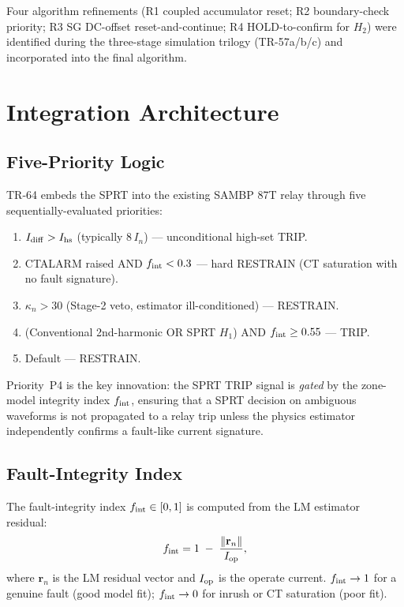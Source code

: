 Four algorithm refinements (R1 coupled accumulator reset; R2 boundary-check
priority; R3 SG DC-offset reset-and-continue; R4 HOLD-to-confirm for $H_2$)
were identified during the three-stage simulation trilogy (TR-57a/b/c) and
incorporated into the final algorithm.

\section{Integration Architecture}
\label{sec:ch5_architecture}

\subsection{Five-Priority Logic}
\label{sec:ch5_5priority}

TR-64 embeds the SPRT into the existing SAMBP 87T relay through five
sequentially-evaluated priorities:

\begin{enumerate}
  \item[\textbf{P1.}] $I_{\rm diff} > I_{\rm hs}$ (typically $8\,I_n$) —
    unconditional high-set TRIP.
  \item[\textbf{P2.}] CTALARM raised AND $f_{\rm int} < 0.3$ — hard RESTRAIN
    (CT saturation with no fault signature).
  \item[\textbf{P3.}] $\kappa_n > 30$ (Stage-2 veto, estimator ill-conditioned)
    — RESTRAIN.
  \item[\textbf{P4.}] (Conventional 2nd-harmonic OR SPRT $H_1$) AND
    $f_{\rm int} \geq 0.55$ — TRIP.
  \item[\textbf{P5.}] Default — RESTRAIN.
\end{enumerate}

Priority~P4 is the key innovation: the SPRT TRIP signal is \emph{gated} by
the zone-model integrity index $f_{\rm int}$, ensuring that a SPRT decision
on ambiguous waveforms is not propagated to a relay trip unless the physics
estimator independently confirms a fault-like current signature.

\subsection{Fault-Integrity Index}
\label{sec:ch5_fint}

The fault-integrity index $f_{\rm int} \in [0, 1]$ is computed from the LM
estimator residual:
\begin{equation}
  f_{\rm int} = 1 \;-\; \frac{\|\mathbf{r}_n\|}{I_{\rm op}},
  \label{eq:ch5_fint}
\end{equation}
where $\mathbf{r}_n$ is the LM residual vector and $I_{\rm op}$ is the operate
current.
$f_{\rm int} \to 1$ for a genuine fault (good model fit);
$f_{\rm int} \to 0$ for inrush or CT saturation (poor fit).

